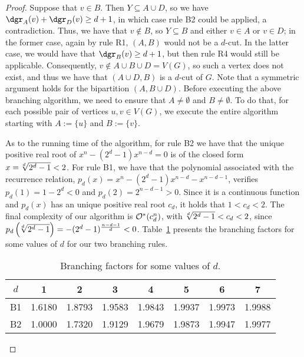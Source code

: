 \begin{proof}
    Suppose that $v \in B$. Then $Y \subseteq A \cup D$, so we have $\dgr_A(v) + \dgr_D(v) \geq d+1$, in which case rule B2 could be applied, a contradiction.
    Thus, we have that $v \notin B$, so $Y \subseteq B$ and either $v \in A$ or $v \in D$;
    in the former case, again by rule R1, $(A, B)$ would not be a $d$-cut.
     In the latter case, we would have that $\dgr_B(v) \geq d+1$, but then rule R4 would still be applicable.
    Consequently, $v \notin A \cup B \cup D = V(G)$, so such a vertex does not exist, and thus we have that $(A \cup D, B)$ is a $d$-cut of $G$.
    Note that a symmetric argument holds for the bipartition $(A, B \cup D)$.
    Before executing the above branching algorithm, we need to ensure that $A \neq \emptyset$ and $B \neq \emptyset$.
    To do that, for each possible pair of vertices $u,v \in V(G)$, we execute the entire algorithm starting with $A := \{u\}$ and $B := \{v\}$.

    As to the running time of the algorithm, for rule B2 we have that the unique positive real root of $x^n - (2^d - 1)x^{n - d} = 0$ is of the closed form $x = \sqrt[\leftroot{2}d]{2^d - 1} < 2$.
    For rule B1, we have that the polynomial associated with the recurrence relation, $p_d(x) = x^n - (2^d - 1)x^{n - d} - x^{n - d - 1}$, verifies $p_d(1) = 1 - 2^d < 0$ and $p_d(2) = 2^{n - d - 1} > 0$.
    Since it is a continuous function and $p_d(x)$ has an unique positive real root $c_d$, it holds that $1 < c_d < 2$.
    The final complexity of our algorithm is $\mathcal{O}^*\!\left(c_d^n\right)$, with $\sqrt[\leftroot{2}d]{2^d - 1} < c_d < 2$, since $p_d\left(\sqrt[\leftroot{2}d]{2^d - 1}\right) = -(2^d - 1)^{\frac{n-d-1}{d}} < 0$.
    Table~\ref{tab:exact_values} presents the branching factors for some values of $d$ for our two branching rules.

\begin{table}[!htb]
    \centering
    \begin{tabular}{c|ccccccc}
         $d$ & 1 & 2 & 3 & 4 & 5 & 6 & 7\\
         \hline
         B1 & 1.6180 & 1.8793 & 1.9583 & 1.9843 & 1.9937 & 1.9973 & 1.9988 \\
         B2 & 1.0000 & 1.7320 & 1.9129 & 1.9679 & 1.9873 & 1.9947 & 1.9977 \\

    \end{tabular}\smallskip
    \caption{Branching factors for some values of $d$.}
    \label{tab:exact_values}
\end{table}
\end{proof} 
